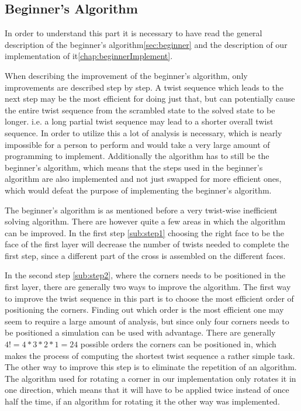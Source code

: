 \subsection{Beginner's Algorithm}
In order to understand this part it is necessary to have read the general description of the beginner's algorithm\ref{sec:beginner} and the description of our implementation of it\ref{chap:beginnerImplement}. 

When describing the improvement of the beginner's algorithm, only improvements are described step by step. 
A twist sequence which leads to the next step may be the most efficient for doing just that, but can potentially cause the entire twist sequence from the scrambled state to the solved state to be longer. 
i.e. a long partial twist sequence may lead to a shorter overall twist sequence. In order to utilize this a lot of analysis is necessary, which is nearly impossible for a person to perform and would take a very large amount of programming to implement.
Additionally the algorithm has to still be the beginner's algorithm, which means that the steps used in the beginner's algorithm are also implemented and not just swapped for more efficient ones, which would defeat the purpose of implementing the beginner's algorithm.


The beginner's algorithm is as mentioned before a very twist-wise inefficient solving algorithm. 
There are however quite a few areas in which the algorithm can be improved.
In the first step \ref{sub:step1} choosing the right face to be the face of the first layer will decrease the number of twists needed to complete the first step, since a different part of the cross is assembled on the different faces.

In the second step \ref{sub:step2}, where the corners needs to be positioned in the first layer, there are generally two ways to improve the algorithm.
The first way to improve the twist sequence in this part is to choose the most efficient order of positioning the corners.
Finding out which order is the most efficient one may seem to require a large amount of analysis, but since only four corners needs to be positioned a simulation can be used with advantage. %
There are generally $4! = 4 * 3 * 2 * 1 = 24$ possible orders the corners can be positioned in, which makes the process of computing the shortest twist sequence a rather simple task. %
The other way to improve this step is to eliminate the repetition of an algorithm. The algorithm used for rotating a corner \cpiece{} in our implementation only rotates it in one direction, which means that it will have to be applied twice instead of once half the time, if an algorithm for rotating it the other way was implemented.

